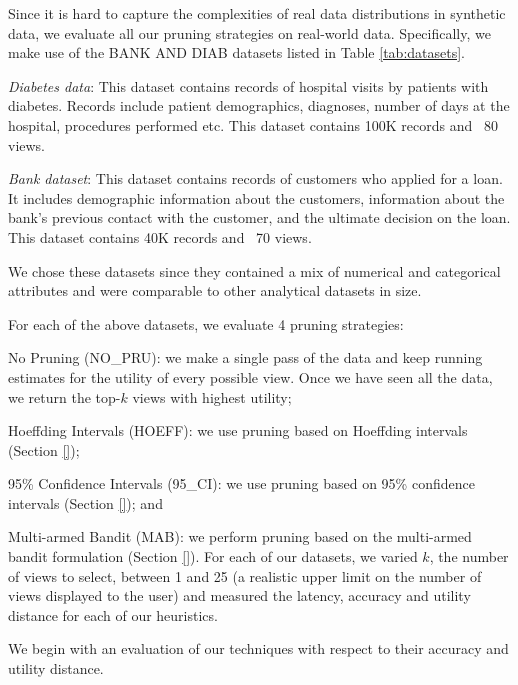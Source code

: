 Since it is hard to capture the complexities of real data distributions in synthetic data, we
evaluate all our pruning strategies on real-world data. 
Specifically, we make use of the BANK AND DIAB datasets listed in Table
\ref{tab:datasets}.
\begin{compactitem}
\item {\it Diabetes data}\cite{}: This dataset contains records of hospital
visits by patients with diabetes. Records include patient demographics,
diagnoses, number of days at the hospital, procedures performed etc. 
This dataset contains 100K records and ~80 views.
\item {\it Bank dataset}\cite{}: This dataset contains records of customers who
applied for a loan. It includes demographic information about the
customers, information about the bank's previous contact with the customer, and
the ultimate decision on the loan.
This dataset contains 40K records and ~70 views.
\end{compactitem}
We chose these datasets since they contained a mix of numerical and categorical
attributes and were comparable to other analytical datasets in size.

For each of the above datasets, we evaluate 4 pruning strategies:
\begin{compactenum}[(a)]
\item No Pruning (NO\_PRU): we make a single pass of the data and keep running
estimates for the utility of every possible view. Once we have seen all the
data, we return the top-$k$ views with highest utility; \item Hoeffding Intervals
(HOEFF):
we use pruning based on Hoeffding intervals (Section \ref{}); \item 95\%
Confidence Intervals (95\_CI): we use pruning based on 95\% confidence intervals
(Section \ref{}); and \item Multi-armed Bandit (MAB): we perform pruning based on
the multi-armed bandit formulation (Section \ref{}).
For each of our datasets, we varied $k$, the number of views to select, between
1 and 25 (a realistic upper limit on the number of views displayed to the user)
and measured the latency, accuracy and utility distance for each of our
heuristics.
\end{compactenum}

We begin with an evaluation of our techniques with respect to their accuracy
and utility distance.\\


